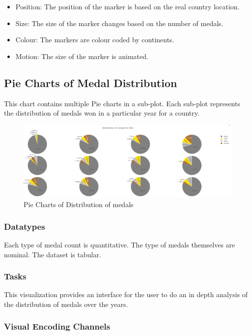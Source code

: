 \documentclass[a4paper, 10pt]{article}
\begin{document}
\begin{itemize}
	\item Position: The position of the marker is based on the real country location.
	\item Size: The size of the marker changes based on the number of medals.
	\item Colour: The markers are colour coded by continents.
	\item Motion: The size of the marker is animated. 
\end{itemize}

\subsection{Pie Charts of Medal Distribution}

This chart contains multiple Pie charts in a sub-plot. Each sub-plot represents the distribution of medals won in a particular year for a country.

\begin{figure}[t]
\centering
\includegraphics[scale=0.3]{pie.png}
\caption{Pie Charts of Distribution of medals}
\end{figure}

\subsubsection{Datatypes}
Each type of medal count is quantitative. The type of medals themselves are nominal. The dataset is tabular.

\subsubsection{Tasks}
This visualization provides an interface for the user to do an in depth analysis of the distribution of medals over the years.

\subsubsection{Visual Encoding Channels}
\end{document}
